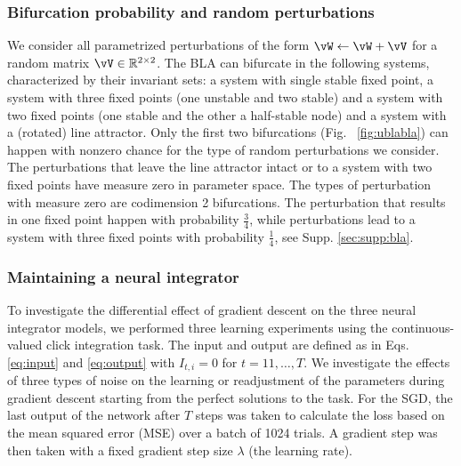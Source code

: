 \documentclass{article} %
\newcounter{ct}
\theoremstyle{definition}
\theoremstyle{remark}
\begin{document}
\subsubsection{Bifurcation probability and random perturbations}
We consider all parametrized perturbations of the form $ \vW \leftarrow \vW + \vV$ for a random matrix $\vV\in \mathbb{R}^{2\times 2}$.
The BLA can bifurcate in the following systems, characterized by their invariant sets: a system with single stable fixed point, a system with three fixed points (one unstable and two stable) and  a system with two fixed points (one stable and the other a half-stable node) and a system with a (rotated) line attractor. 
Only the first two bifurcations (Fig. ~\ref{fig:ublabla}) can happen with nonzero chance for the type of random perturbations we consider.
The perturbations that leave the line attractor intact or to a system with two fixed points have measure zero in parameter space.
The types of perturbation with measure zero are codimension 2 bifurcations.
The perturbation that results in one fixed point happen with probability $\frac{3}{4}$, while perturbations lead to a system with three fixed points with probability $\frac{1}{4}$, see Supp. \ref{sec:supp:bla}.




\subsubsection{Maintaining a neural integrator}\label{sec:exp:maintaining}
To investigate the differential effect of gradient descent on the three neural integrator models, we performed three learning experiments using the continuous-valued click integration task.
The input and output are defined as in Eqs. \ref{eq:input} and \ref{eq:output} with $I_{t,i}=0$ for $t=11,\dots,T$.
We investigate the effects of three types of noise on the learning or readjustment of the parameters during gradient descent starting from the perfect solutions to the task.
For the SGD, the last output of the network after $T$ steps was taken to calculate the loss based on the mean squared error (MSE) over a batch of 1024 trials. A gradient step was then taken with a fixed gradient step size $\lambda$ (the learning rate).
\end{document}
